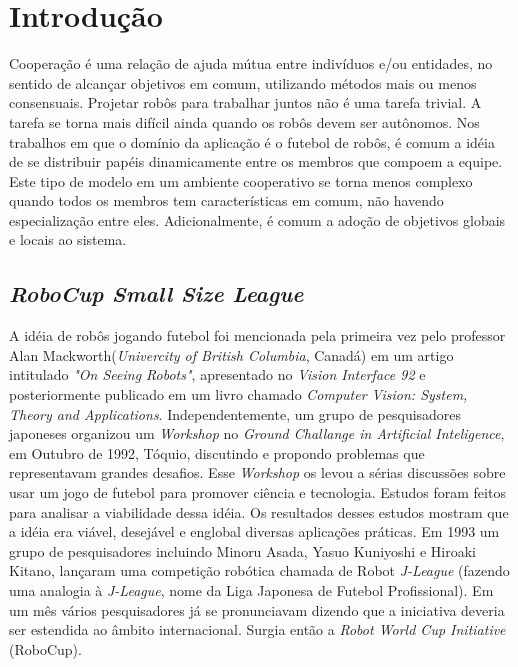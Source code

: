 \chapter{Introdução}

Cooperação é uma relação de ajuda mútua entre indivíduos e/ou entidades, no sentido
de alcançar objetivos em comum, utilizando métodos mais ou menos consensuais. Projetar
robôs para trabalhar juntos não é uma tarefa trivial. A tarefa se torna mais difícil
ainda quando os robôs devem ser autônomos. Nos trabalhos em que o domínio da aplicação
é o futebol de robôs, é comum a idéia de se distribuir papéis dinamicamente entre os
membros que compoem a equipe. Este tipo de modelo em um ambiente cooperativo se torna
menos complexo quando todos os membros tem características em comum, não havendo especialização
entre eles. Adicionalmente, é comum a adoção de objetivos globais e locais ao sistema.

\section{\textit{RoboCup Small Size League}}

A idéia de robôs jogando futebol foi mencionada pela primeira vez pelo professor
Alan Mackworth(\textit{Univercity of British Columbia}, Canadá) em um artigo intitulado
\textit{"On Seeing Robots"}, apresentado no \textit{Vision Interface 92} e posteriormente publicado em
um livro chamado \textit{Computer Vision: System, Theory and Applications}. Independentemente,
um grupo de pesquisadores japoneses organizou um \textit{Workshop} no \textit{Ground Challange 
in Artificial Inteligence}, em Outubro de 1992, Tóquio, discutindo e propondo problemas que
representavam grandes desafios. Esse \textit{Workshop} os levou a sérias discussões sobre 
usar um jogo de futebol para promover ciência e tecnologia. Estudos foram feitos para
analisar a viabilidade dessa idéia. Os resultados desses estudos mostram que
a idéia era viável, desejável e englobal diversas aplicações práticas. Em 1993 um
grupo de pesquisadores incluindo Minoru Asada, Yasuo Kuniyoshi e Hiroaki Kitano,
lançaram uma competição robótica chamada de Robot \textit{J-League} (fazendo uma analogia à
\textit{J-League}, nome da Liga Japonesa de Futebol Profissional). Em um mês vários 
pesquisadores já se pronunciavam dizendo que a iniciativa deveria ser estendida ao 
âmbito internacional. Surgia então a \textit{Robot World Cup Initiative} (RoboCup).

